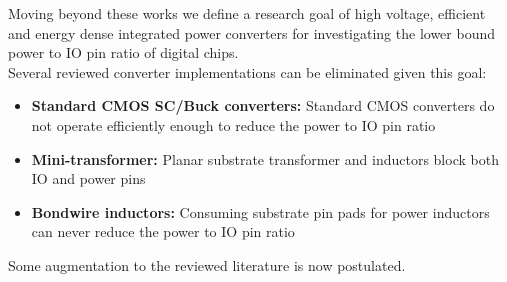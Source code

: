 \documentclass[letterpaper,twocolumn,10pt]{article}
\begin{document}
Moving beyond these works we define a research goal of high voltage, efficient and energy dense integrated power converters for investigating the lower bound power to IO pin ratio of digital chips.\\
Several reviewed converter implementations can be eliminated given this goal:
\begin{itemize}
\item{\textbf{Standard CMOS SC/Buck converters: }Standard CMOS converters do not operate efficiently enough to reduce the power to IO pin ratio}
\item{\textbf{Mini-transformer: }Planar substrate transformer and inductors block both IO and power pins }
\item{\textbf{Bondwire inductors: }Consuming substrate pin pads for power inductors can never reduce the power to IO pin ratio}
\end{itemize}   
Some augmentation to the reviewed literature is now postulated.\\
\end{document}
